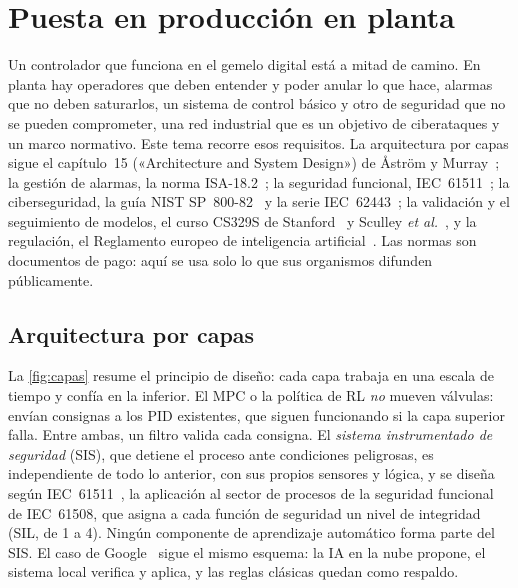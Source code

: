 \chapter{Puesta en producción en planta}
\label{tema:6}

Un controlador que funciona en el gemelo digital está a mitad de camino. En planta hay operadores que deben entender y poder anular lo que hace, alarmas que no deben saturarlos, un sistema de control básico y otro de seguridad que no se pueden comprometer, una red industrial que es un objetivo de ciberataques y un marco normativo. Este tema recorre esos requisitos. La arquitectura por capas sigue el capítulo~15 («Architecture and System Design») de Åström y Murray~\cite{am}; la gestión de alarmas, la norma ISA-18.2~\cite{isa182}; la seguridad funcional, IEC~61511~\cite{iec61511}; la ciberseguridad, la guía NIST SP~800-82~\cite{nist} y la serie IEC~62443~\cite{iec62443}; la validación y el seguimiento de modelos, el curso CS329S de Stanford~\cite{cs329s} y Sculley \emph{et al.}~\cite{sculley}, y la regulación, el Reglamento europeo de inteligencia artificial~\cite{aiact}. Las normas son documentos de pago: aquí se usa solo lo que sus organismos difunden públicamente.

\section{Arquitectura por capas}

\addtocounter{figure}{1}%

La \cref{fig:capas} resume el principio de diseño: cada capa trabaja en una escala de tiempo y confía en la inferior. El MPC o la política de RL \emph{no} mueven válvulas: envían consignas a los PID existentes, que siguen funcionando si la capa superior falla. Entre ambas, un filtro valida cada consigna. El \emph{sistema instrumentado de seguridad} (SIS), que detiene el proceso ante condiciones peligrosas, es independiente de todo lo anterior, con sus propios sensores y lógica, y se diseña según IEC~61511~\cite{iec61511}, la aplicación al sector de procesos de la seguridad funcional de IEC~61508, que asigna a cada función de seguridad un nivel de integridad (SIL, de 1 a 4). Ningún componente de aprendizaje automático forma parte del SIS. El caso de Google~\cite{gamblegao} sigue el mismo esquema: la IA en la nube propone, el sistema local verifica y aplica, y las reglas clásicas quedan como respaldo.

